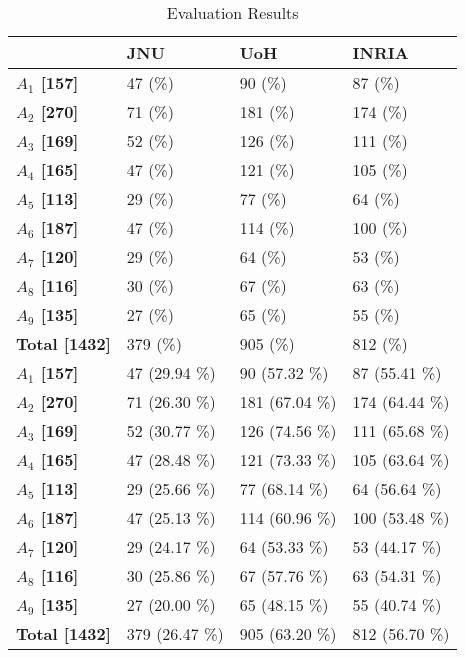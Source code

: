 \documentclass[11pt]{article}
\begin{document}
\begin{table}[h]
	\begin{center}
		\begin{tabular}{p{1.4cm} | p{1.6cm} | p{1.5cm} | p{1.5cm}}
			\hline 
			& \bf JNU & \bf UoH & \bf INRIA \\
			\hline
			\bf $A_1$ [157] &   47 (\%) &   90 (\%) &   87 (\%) \\
			\bf $A_2$ [270] &   71 (\%) &   181 (\%) &   174 (\%) \\
			\bf $A_3$ [169] &   52 (\%) &   126 (\%) &   111 (\%) \\
			\bf $A_4$ [165] &   47 (\%) &   121 (\%) &   105 (\%) \\
			\bf $A_5$ [113] &   29 (\%) &   77 (\%) &   64 (\%) \\
			\bf $A_6$ [187] &   47 (\%) &   114 (\%) &   100 (\%) \\
			\bf $A_7$ [120] &   29 (\%) &   64 (\%) &   53 (\%) \\
			\bf $A_8$ [116] &   30 (\%) &   67 (\%) &   63 (\%) \\
			\bf $A_9$ [135] &   27 (\%) &   65 (\%) &   55 (\%) \\
			\bf Total [1432] &   379 (\%) &   905 (\%) &   812 (\%) \\
			
			
			\bf $A_1$ [157] &   47 (29.94 \%) &   90 (57.32 \%) &   87 (55.41 \%) \\
			\bf $A_2$ [270] &   71 (26.30 \%) &   181 (67.04 \%) &   174 (64.44 \%) \\
			\bf $A_3$ [169] &   52 (30.77 \%) &   126 (74.56 \%) &   111 (65.68 \%) \\
			\bf $A_4$ [165] &   47 (28.48 \%) &   121 (73.33 \%) &   105 (63.64 \%) \\
			\bf $A_5$ [113] &   29 (25.66 \%) &   77 (68.14 \%) &   64 (56.64 \%) \\
			\bf $A_6$ [187] &   47 (25.13 \%) &   114 (60.96 \%) &   100 (53.48 \%) \\
			\bf $A_7$ [120] &   29 (24.17 \%) &   64 (53.33 \%) &   53 (44.17 \%) \\
			\bf $A_8$ [116] &   30 (25.86 \%) &   67 (57.76 \%) &   63 (54.31 \%) \\
			\bf $A_9$ [135] &   27 (20.00 \%) &   65 (48.15 \%) &   55 (40.74 \%) \\
			\bf Total [1432] &   379 (26.47 \%) &   905 (63.20 \%) &   812 (56.70 \%) \\
			\hline
		\end{tabular}
	\end{center}
	\caption{\label{font-table} Evaluation Results }
\end{table}
\end{document}

